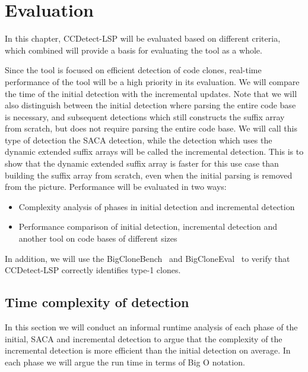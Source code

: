 \chapter{Evaluation}
\label{evaluation}

In this chapter, CCDetect-LSP will be evaluated based on different criteria, which combined
will provide a basis for evaluating the tool as a whole.

Since the tool is focused on efficient detection of code clones, real-time performance of
the tool will be a high priority in its evaluation. We will compare the time of the
initial detection with the incremental updates. Note that we will also distinguish between
the initial detection where parsing the entire code base is necessary, and subsequent
detections which still constructs the suffix array from scratch, but does not require
parsing the entire code base. We will call this type of detection the SACA detection,
while the detection which uses the dynamic extended suffix arrays will be called the
incremental detection. This is to show that the dynamic extended suffix array is faster
for this use case than building the suffix array from scratch, even when the initial
parsing is removed from the picture. Performance will be evaluated in two ways:

\begin{itemize}
    \item Complexity analysis of phases in initial detection and incremental detection
    \item Performance comparison of initial detection, incremental detection and another
        tool on code bases of different sizes
\end{itemize}

In addition, we will use the BigCloneBench~\cite{BigCloneBench} and
BigCloneEval~\cite{BigCloneEval} to verify that CCDetect-LSP correctly identifies type-1
clones.

\section{Time complexity of detection}

In this section we will conduct an informal runtime analysis of each phase of the initial,
SACA and incremental detection to argue that the complexity of the incremental detection
is more efficient than the initial detection on average. In each phase we will argue the
run time in terms of Big O notation.

